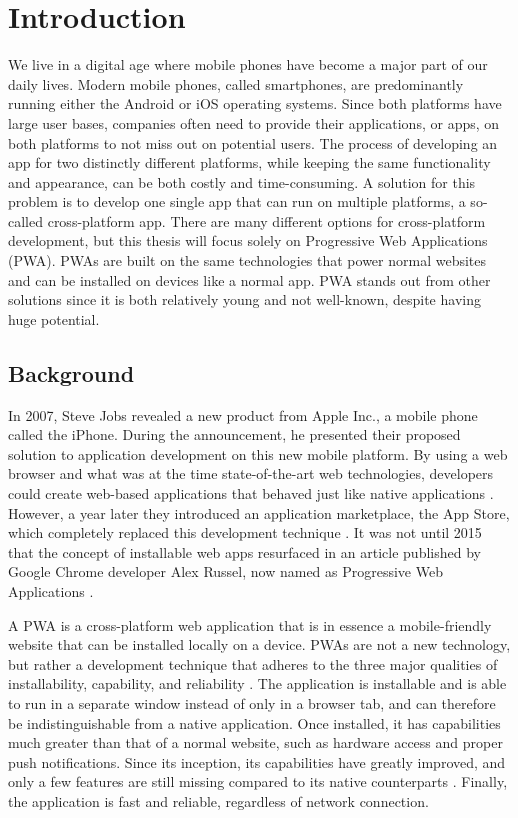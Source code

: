 \documentclass[a4paper,12pt]{article}
\begin{document}
\section{Introduction}
We live in a digital age where mobile phones have become a major part of our daily lives. Modern mobile phones, called smartphones, are predominantly running either the Android or iOS operating systems. Since both platforms have large user bases, companies often need to provide their applications, or apps, on both platforms to not miss out on potential users. The process of developing an app for two distinctly different platforms, while keeping the same functionality and appearance, can be both costly and time-consuming. A solution for this problem is to develop one single app that can run on multiple platforms, a so-called cross-platform app. There are many different options for cross-platform development, but this thesis will focus solely on Progressive Web Applications (PWA). PWAs are built on the same technologies that power normal websites and can be installed on devices like a normal app. PWA stands out from other solutions since it is both relatively young and not well-known, despite having huge potential.

\subsection{Background}
In 2007, Steve Jobs revealed a new product from Apple Inc., a mobile phone called the iPhone. During the announcement, he presented their proposed solution to application development on this new mobile platform. By using a web browser and what was at the time state-of-the-art web technologies, developers could create web-based applications that behaved just like native applications \cite{stevejobs_pwa}. However, a year later they introduced an application marketplace, the App Store, which completely replaced this development technique \cite{stevejobs_appstore}. It was not until 2015 that the concept of installable web apps resurfaced in an article published by Google Chrome developer Alex Russel, now named as Progressive Web Applications \cite{russel_pwa}. 

A PWA is a cross-platform web application that is in essence a mobile-friendly website that can be installed locally on a device. PWAs are not a new technology, but rather a development technique that adheres to the three major qualities of installability, capability, and reliability \cite{whatarepwas}. The application is installable and is able to run in a separate window instead of only in a browser tab, and can therefore be indistinguishable from a native application. Once installed, it has capabilities much greater than that of a normal website, such as hardware access and proper push notifications. Since its inception, its capabilities have greatly improved, and only a few features are still missing compared to its native counterparts \cite{whatwebcando}. Finally, the application is fast and reliable, regardless of network connection. 
 
\end{document}
